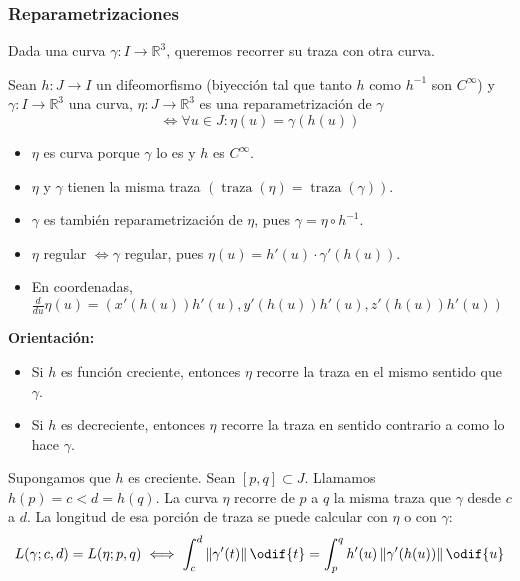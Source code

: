\documentclass[12pt]{article}
\theoremstyle{plain}
\newcommand{\R}{\mathbb{R}}
\newcommand{\norm}[1]{\left\Vert#1\right\Vert}
\newcommand{\appl}[3]{#1 \colon #2 \longrightarrow #3}
\newcommand{\ds}{\displaystyle}
\newcommand{\trz}[1]{\operatorname{traza}\left(#1\right)}
\renewcommand{\norm}[1]{\left\Vert#1\right\Vert}
\begin{document}
\subsubsection{Reparametrizaciones}

Dada una curva $\appl{\gamma}{I}{\R^3}$, queremos recorrer su traza con otra curva.
\begin{defn}
    Sean $\appl{h}{J}{I}$ un difeomorfismo (biyección tal que tanto $h$ como $h^{-1}$ son $C^\infty$) y $\appl{\gamma}{I}{\R^3}$ una curva, $\appl{\eta}{J}{\R^3}$ es una reparametrización de $\gamma$
    \[ \iff \forall u \in J : \eta(u)=\gamma(h(u))\]
    \begin{itemize}[topsep=1pt, itemsep=1pt,parsep=3pt]
        \item $\eta$ es curva porque $\gamma$ lo es y $h$ es $C^\infty$.
        \item $\eta$ y $\gamma$ tienen la misma traza $(\trz{\eta}=\trz{\gamma})$.
        \item $\gamma$ es también reparametrización de $\eta$, pues $\gamma = \eta \circ h^{-1}$.
        \item $\eta$ regular $\iff \gamma$ regular, pues $\eta(u) = h'(u)\cdot\gamma'(h(u))$.
        \item En coordenadas, $\ds \frac{d}{du}\eta(u)=\left(x'(h(u))h'(u), y'(h(u))h'(u), z'(h(u))h'(u)\right)$
    \end{itemize}
\end{defn}
\noindent \textbf{Orientación:}
\begin{itemize}[topsep=0pt, itemsep=1pt,parsep=3pt]
    \item Si $h$ es función creciente, entonces $\eta$ recorre la traza en el mismo sentido que $\gamma$.
    \item Si $h$ es decreciente, entonces $\eta$ recorre la traza en sentido contrario a como lo hace $\gamma$.
\end{itemize}
Supongamos que $h$ es creciente. Sean $\left[p, q\right]\subset J$. Llamamos $h(p)=c<d=h(q)$. La curva $\eta$ recorre de $p$ a $q$ la misma traza que $\gamma$ desde $c$ a $d$. La longitud de esa porción de traza se puede calcular con $\eta$ o con $\gamma$:
\[L(\gamma; c, d)=L(\eta; p, q) \iff \int_c^d\norm{\gamma'(t)}\odif{t}=\int_p^qh'(u)\norm{\gamma'(h(u))}\odif{u}\]
\end{document}
